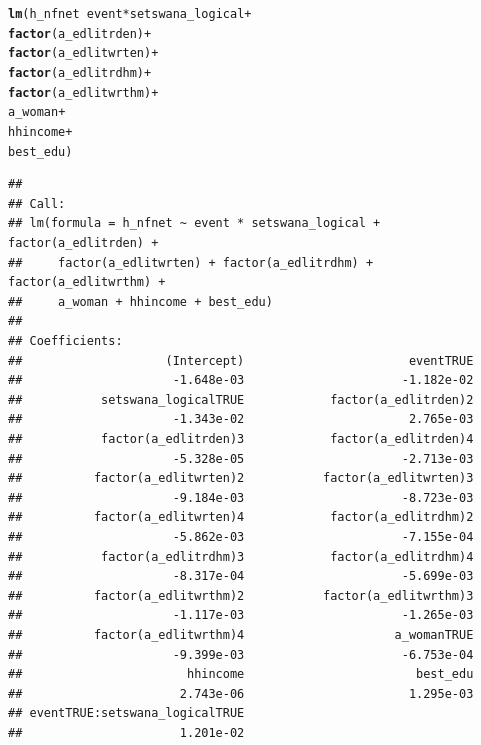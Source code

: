 \documentclass[a4paper,british]{article}\usepackage[]{graphicx}\usepackage[]{xcolor}
\makeatletter
\newcommand{\hlopt}[1]{\textcolor[rgb]{0,0,0}{#1}}%
\newcommand{\hlstd}[1]{\textcolor[rgb]{0.345,0.345,0.345}{#1}}%
\newcommand{\hlkwd}[1]{\textcolor[rgb]{0.737,0.353,0.396}{\textbf{#1}}}%
\newenvironment{kframe}{%
 \def\at@end@of@kframe{}%
 \ifinner\ifhmode%
  \def\at@end@of@kframe{\end{minipage}}%
  \begin{minipage}{\columnwidth}%
 \fi\fi%
 \def\FrameCommand##1{\hskip\@totalleftmargin \hskip-\fboxsep
 \colorbox{shadecolor}{##1}\hskip-\fboxsep
     \hskip-\linewidth \hskip-\@totalleftmargin \hskip\columnwidth}%
 \MakeFramed {\advance\hsize-\width
   \@totalleftmargin\z@ \linewidth\hsize
   \@setminipage}}%
 {\par\unskip\endMakeFramed%
 \at@end@of@kframe}
\newenvironment{knitrout}{}{} %
\makeatother
\begin{document}
\begin{table}[H]
\caption{Living in Household that Spent on Internet (last 30 days)}
\label{tab:nfnet}

\begin{knitrout}
\color{fgcolor}\begin{kframe}
\begin{alltt}
\hlkwd{lm}\hlstd{(h_nfnet} \hlopt{~}  \hlstd{event}\hlopt{*}\hlstd{setswana_logical} \hlopt{+}
              \hlkwd{factor}\hlstd{(a_edlitrden)}    \hlopt{+}
              \hlkwd{factor}\hlstd{(a_edlitwrten)}   \hlopt{+}
              \hlkwd{factor}\hlstd{(a_edlitrdhm)}    \hlopt{+}
              \hlkwd{factor}\hlstd{(a_edlitwrthm)}   \hlopt{+}
              \hlstd{a_woman}                \hlopt{+}
              \hlstd{hhincome}               \hlopt{+}
              \hlstd{best_edu                )}
\end{alltt}
\begin{verbatim}
## 
## Call:
## lm(formula = h_nfnet ~ event * setswana_logical + factor(a_edlitrden) + 
##     factor(a_edlitwrten) + factor(a_edlitrdhm) + factor(a_edlitwrthm) + 
##     a_woman + hhincome + best_edu)
## 
## Coefficients:
##                    (Intercept)                       eventTRUE  
##                     -1.648e-03                      -1.182e-02  
##           setswana_logicalTRUE            factor(a_edlitrden)2  
##                     -1.343e-02                       2.765e-03  
##           factor(a_edlitrden)3            factor(a_edlitrden)4  
##                     -5.328e-05                      -2.713e-03  
##          factor(a_edlitwrten)2           factor(a_edlitwrten)3  
##                     -9.184e-03                      -8.723e-03  
##          factor(a_edlitwrten)4            factor(a_edlitrdhm)2  
##                     -5.862e-03                      -7.155e-04  
##           factor(a_edlitrdhm)3            factor(a_edlitrdhm)4  
##                     -8.317e-04                      -5.699e-03  
##          factor(a_edlitwrthm)2           factor(a_edlitwrthm)3  
##                     -1.117e-03                      -1.265e-03  
##          factor(a_edlitwrthm)4                     a_womanTRUE  
##                     -9.399e-03                      -6.753e-04  
##                       hhincome                        best_edu  
##                      2.743e-06                       1.295e-03  
## eventTRUE:setswana_logicalTRUE  
##                      1.201e-02
\end{verbatim}
\end{kframe}
\end{knitrout}
\end{table}
\end{document}
